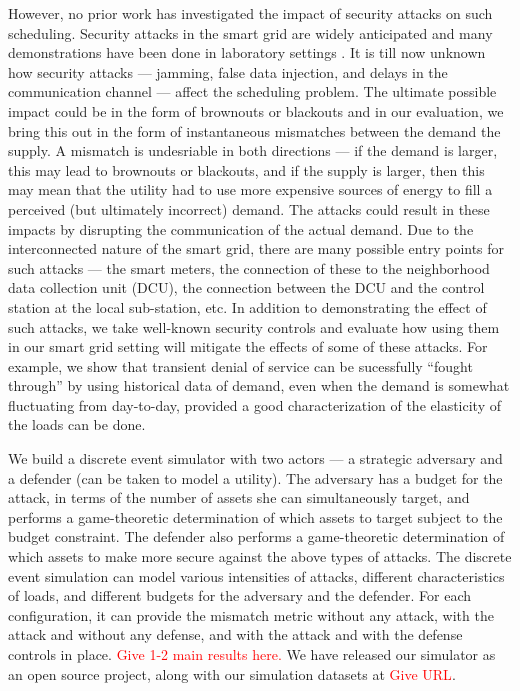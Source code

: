 \documentclass[conference]{IEEEtran}
\begin{document}
However, no prior work has investigated the impact of security attacks on such scheduling. Security attacks in the smart grid are widely anticipated \cite{nist} and many demonstrations have been done in laboratory settings \cite{hussain2012ncs}. It is till now unknown how security attacks --- jamming, false data injection, and delays in the communication channel --- affect the scheduling problem. The ultimate possible impact could be in the form of brownouts or blackouts and in our evaluation, we bring this out in the form of instantaneous mismatches between the demand the supply. A mismatch is undesriable in both directions --- if the demand is larger, this may lead to brownouts or blackouts, and if the supply is larger, then this may mean that the utility had to use more expensive sources of energy to fill a perceived (but ultimately incorrect) demand. The attacks could result in these impacts by disrupting the communication of the actual demand. Due to the interconnected nature of the smart grid, there are many possible entry points for such attacks --- the smart meters, the connection of these to the neighborhood data collection unit (DCU), the connection between the DCU and the control station at the local sub-station, etc. In addition to demonstrating the effect of such attacks, we take well-known security controls and evaluate how using them in our smart grid setting will mitigate the effects of some of these attacks. For example, we show that transient denial of service can be sucessfully ``fought through'' by using historical data of demand, even when the demand is somewhat fluctuating from day-to-day, provided a good characterization of the elasticity of the loads can be done. 

We build a discrete event simulator with two actors --- a strategic adversary and a defender (can be taken to model a utility). The adversary has a budget for the attack, in terms of the number of assets she can simultaneously target, and performs a game-theoretic determination of which assets to target subject to the budget constraint. The defender also performs a game-theoretic determination of which assets to make more secure against the above types of attacks. The discrete event simulation can model various intensities of attacks, different characteristics of loads, and different budgets for the adversary and the defender. For each configuration, it can provide the mismatch metric without any attack, with the attack and without any defense, and with the attack and with the defense controls in place. 
\textcolor{red} {Give 1-2 main results here.}
We have released our simulator as an open source project, along with our simulation datasets at \textcolor{red}{Give URL}. 
\end{document}
